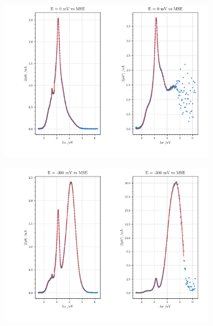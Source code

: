 \documentclass[10pt, 3p, sort&compress]{elsarticle}
\newcommand{\coef}{0.1}
\begin{document}
\renewcommand{\coef}{0.32}
\begin{figure}[htpb]
	\centering
	\begin{subfigure}{\coef\textwidth}
		\centering
	 	\includegraphics[width=\textwidth]{Anusara-690-0mV.png}
	 	\caption{}
	 	\label{fig:data_srisrual1}
	\end{subfigure}
	\begin{subfigure}{\coef\textwidth}
		\centering
	 	\includegraphics[width=\textwidth]{Anusara-690-300mV.png}
	 	\caption{}
	 	\label{fig:data_srisrual2}
	\end{subfigure}
	\begin{subfigure}{\coef\textwidth}
		\centering

\end{subfigure}
\end{figure}
\end{document}
